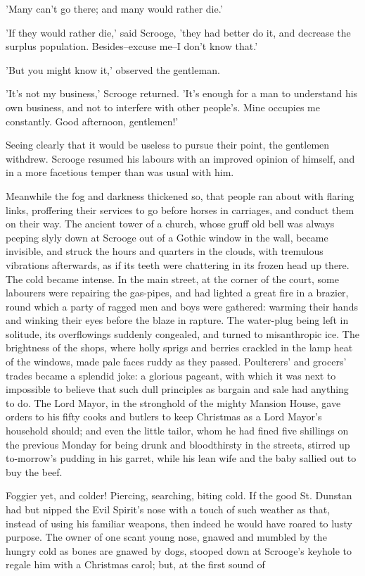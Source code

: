 'Many can't go there; and many would rather die.'

'If they would rather die,' said Scrooge, 'they had better do it, and
decrease the surplus population. Besides--excuse me--I don't know that.'

'But you might know it,' observed the gentleman.

'It's not my business,' Scrooge returned. 'It's enough for a man to
understand his own business, and not to interfere with other people's.
Mine occupies me constantly. Good afternoon, gentlemen!'

Seeing clearly that it would be useless to pursue their point, the
gentlemen withdrew. Scrooge resumed his labours with an improved opinion
of himself, and in a more facetious temper than was usual with him.

Meanwhile the fog and darkness thickened so, that people ran about with
flaring links, proffering their services to go before horses in
carriages, and conduct them on their way. The ancient tower of a church,
whose gruff old bell was always peeping slyly down at Scrooge out of a
Gothic window in the wall, became invisible, and struck the hours and
quarters in the clouds, with tremulous vibrations afterwards, as if its
teeth were chattering in its frozen head up there. The cold became
intense. In the main street, at the corner of the court, some labourers
were repairing the gas-pipes, and had lighted a great fire in a brazier,
round which a party of ragged men and boys were gathered: warming their
hands and winking their eyes before the blaze in rapture. The water-plug
being left in solitude, its overflowings suddenly congealed, and turned
to misanthropic ice. The brightness of the shops, where holly sprigs and
berries crackled in the lamp heat of the windows, made pale faces ruddy
as they passed. Poulterers' and grocers' trades became a splendid joke:
a glorious pageant, with which it was next to impossible to believe that
such dull principles as bargain and sale had anything to do. The Lord
Mayor, in the stronghold of the mighty Mansion House, gave orders to his
fifty cooks and butlers to keep Christmas as a Lord Mayor's household
should; and even the little tailor, whom he had fined five shillings on
the previous Monday for being drunk and bloodthirsty in the streets,
stirred up to-morrow's pudding in his garret, while his lean wife and
the baby sallied out to buy the beef.

Foggier yet, and colder! Piercing, searching, biting cold. If the good
St. Dunstan had but nipped the Evil Spirit's nose with a touch of such
weather as that, instead of using his familiar weapons, then indeed he
would have roared to lusty purpose. The owner of one scant young nose,
gnawed and mumbled by the hungry cold as bones are gnawed by dogs,
stooped down at Scrooge's keyhole to regale him with a Christmas carol;
but, at the first sound of

